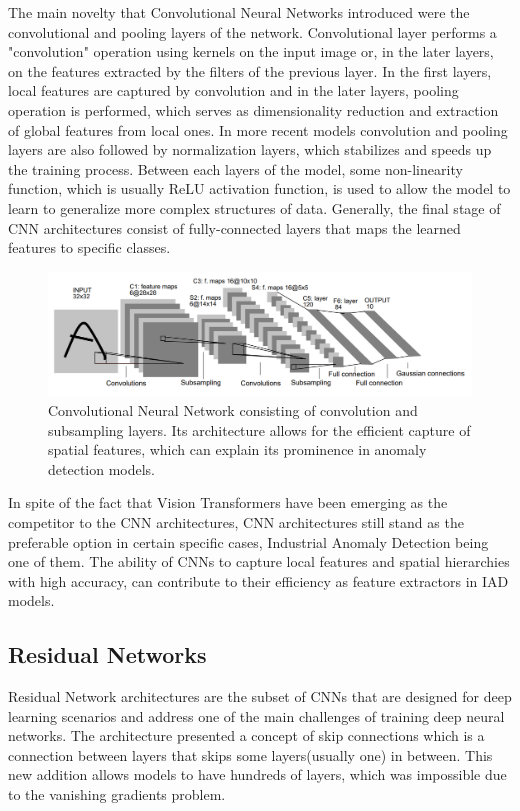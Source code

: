 The main novelty that Convolutional Neural Networks introduced were the convolutional and pooling layers of the network. Convolutional layer performs a "convolution" operation using kernels on the input image or, in the later layers, on the features extracted by the filters of the previous layer. In the first layers, local features are captured by convolution and in the later layers, pooling operation is performed, which serves as dimensionality reduction and extraction of global features from local ones. In more recent models convolution and pooling layers are also followed by normalization layers, which stabilizes and speeds up the training process. Between each layers of the model, some non-linearity function, which is usually ReLU activation function, is used to allow the model to learn to generalize more complex structures of data. Generally, the final stage of CNN architectures consist of fully-connected layers that maps the learned features to specific classes.

\begin{figure}[h]
	\begin{center}
		\includegraphics[width=1.0\linewidth]{Chapter_2/cnn.png}
	\end{center}
	\caption{Convolutional Neural Network consisting of convolution and subsampling layers. Its architecture allows for the efficient capture of spatial features, which can explain its prominence in anomaly detection models.}
	\label{fig:cnn}
\end{figure}

In spite of the fact that Vision Transformers have been emerging as the competitor to the CNN architectures, CNN architectures still stand as the preferable option in certain specific cases, Industrial Anomaly Detection being one of them. The ability of CNNs to capture local features and spatial hierarchies with high accuracy, can contribute to their efficiency as feature extractors in IAD models.

\subsection{Residual Networks}
\label{resnet}
Residual Network architectures are the subset of CNNs that are designed for deep learning scenarios and address one of the main challenges of training deep neural networks. The architecture presented a concept of skip connections which is a connection between layers that skips some layers(usually one) in between. This new addition allows models to have hundreds of layers, which was impossible due to the vanishing gradients problem.

